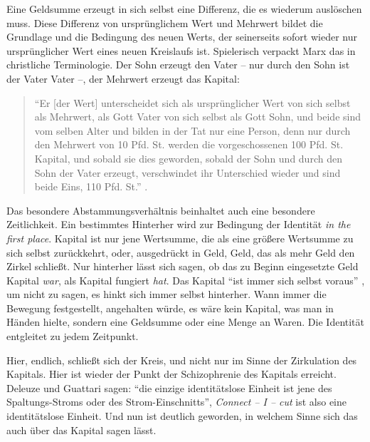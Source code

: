 \documentclass[12pt,
               DIV13,
               paper=a4,
               twoside=false,
               onehalfspacing,
               bibliography=totoc,
               toc=graduated,
               draft,
               ]{scrartcl}
\newcommand{\pc}[2]{\parencite[#1]{#2}}
\newcommand{\cic}{Connect -- I -- cut\xspace}
\newcommand{\dg}{Deleuze und Guattari\xspace}
\begin{document}
Eine Geldsumme erzeugt in sich selbst eine Differenz, die es wiederum
auslöschen muss. Diese Differenz von ursprünglichem Wert und Mehrwert
bildet die Grundlage und die Bedingung des neuen Werts, der
seinerseits sofort wieder nur \glq ursprünglicher\grq{} Wert eines
neuen Kreislaufs ist. Spielerisch verpackt Marx das in christliche
Terminologie. Der Sohn erzeugt den Vater -- nur durch den Sohn ist der
Vater Vater --, der Mehrwert erzeugt das Kapital:
%
\begin{spacing}{1}
\begin{quote}
"`Er [der Wert] unterscheidet sich als ursprünglicher
Wert von sich selbst als Mehrwert, als Gott Vater von sich selbst als
Gott Sohn, und beide sind vom selben Alter und bilden in der Tat nur
eine Person, denn nur durch den Mehrwert von 10 Pfd. St. werden die
vorgeschossenen 100 Pfd. St. Kapital, und sobald sie dies geworden,
sobald der Sohn und durch den Sohn der Vater erzeugt, verschwindet ihr
Unterschied wieder und sind beide Eins, 110 Pfd. St."' \pc{S. 169
f.}{kap}.
\end{quote}
\end{spacing}

Das besondere Abstammungsverhältnis beinhaltet auch eine besondere
Zeitlichkeit. Ein bestimmtes \glq Hinterher\grq{} wird zur Bedingung der
Identität \emph{in the first place}. Kapital ist nur jene
Wertsumme, die als eine größere Wertsumme zu sich selbst zurückkehrt,
oder, ausgedrückt in Geld, Geld, das als mehr Geld den Zirkel
schließt. Nur hinterher lässt sich sagen, ob das zu Beginn eingesetzte
Geld Kapital \emph{war}, als Kapital fungiert \emph{hat}. Das Kapital
"`ist immer sich selbst voraus"' \pc{125}{strauss}, um nicht zu sagen,
es hinkt sich immer selbst hinterher. Wann immer die Bewegung
festgestellt, angehalten würde, es wäre kein Kapital, was man in
Händen hielte, sondern eine Geldsumme oder eine Menge an Waren. Die
Identität entgleitet zu jedem Zeitpunkt.

Hier, endlich, schließt sich der Kreis, und nicht nur im Sinne der
Zirkulation des Kapitals. Hier ist wieder der Punkt der Schizophrenie
des Kapitals erreicht. \dg sagen: "`die einzige identitätslose Einheit
ist jene des Spaltungs-Stroms oder des Strom-Einschnitts"',
\emph{\cic} ist also eine identitätslose Einheit. Und nun ist deutlich
geworden, in welchem Sinne sich das auch über das Kapital sagen lässt.
\end{document}
